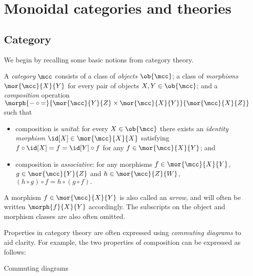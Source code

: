 \chapter{Monoidal categories and theories}

\section{Category}

We begin by recalling some basic notions from category theory.

\begin{definition}[Category]
    A \emph{category} \(\mcc\) consists of a class of \emph{objects}
    \(\ob{\mcc}\); a class of \emph{morphisms} \(\mor{\mcc}{X}{Y}\)
    for every pair of objects \(X, Y \in \ob{\mcc}\); and a \emph{composition}
    operation \(
        \morph{
            {-} \circ {=}
        }{
            \mor{\mcc}{Y}{Z} \times \mor{\mcc}{X}{Y}
        }{
            \mor{\mcc}{X}{Z}
        }
    \) such that
    \begin{itemize}
        \item composition is \emph{unital}: for every \(
                    X \in \ob{\mcc}
                \) there exists an \emph{identity morphism} \(
                    \id[X] \in \mor{\mcc}{X}{X}
                \) satisfying \(
                    f \circ \id[X] = f = \id[Y] \circ f
                \) for any \(
                    f \in \mor{\mcc}{X}{Y}
                \); and
        \item composition is \emph{associative}: for any morphisms \(
                    f \in \mor{\mcc}{X}{Y}
                \), \(
                    g \in \mor{\mcc}{Y}{Z}
                \) and \(h \in \mor{\mcc}{Z}{W}\), \(
                    (h \circ g) \circ f = h \circ (g \circ f).
                \)
    \end{itemize}
\end{definition}

A morphism \(f \in \mor{\mcc}{X}{Y}\) is also called an \emph{arrow}, and will
often be written \(\morph{f}{X}{Y}\) accordingly.
The subscripts on the object and morphism classes are also often omitted.

Properties in category theory are often expressed using
\emph{commuting diagrams} to aid clarity.
For example, the two properties of composition can be expressed as follows:

\begin{center}
    Commuting diagrams
\end{center}

